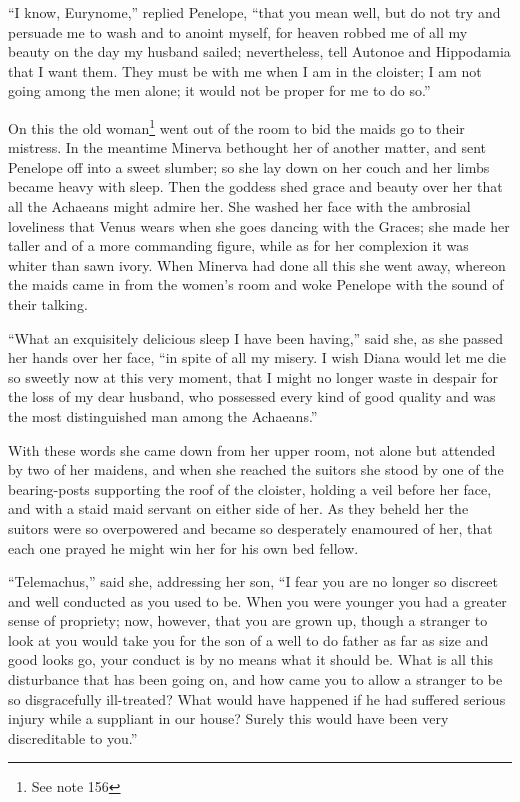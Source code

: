 “I know, Eurynome,” replied Penelope, “that you mean well, but do not try and
persuade me to wash and to anoint myself, for heaven robbed me of all my beauty
on the day my husband sailed; nevertheless, tell Autonoe and Hippodamia that I
want them. They must be with me when I am in the cloister; I am not going among
the men alone; it would not be proper for me to do so.”

On this the old woman\footnote{See note 156} went out of the room to bid the
maids go to their mistress. In the meantime Minerva bethought her of another
matter, and sent Penelope off into a sweet slumber; so she lay down on her
couch and her limbs became heavy with sleep. Then the goddess shed grace and
beauty over her that all the Achaeans might admire her. She washed her face
with the ambrosial loveliness that Venus wears when she goes dancing with the
Graces; she made her taller and of a more commanding figure, while as for her
complexion it was whiter than sawn ivory. When Minerva had done all this she
went away, whereon the maids came in from the women’s room and woke Penelope
with the sound of their talking.

“What an exquisitely delicious sleep I have been having,” said she, as she
passed her hands over her face, “in spite of all my misery. I wish Diana would
let me die so sweetly now at this very moment, that I might no longer waste in
despair for the loss of my dear husband, who possessed every kind of good
quality and was the most distinguished man among the Achaeans.”

With these words she came down from her upper room, not alone but attended by
two of her maidens, and when she reached the suitors she stood by one of the
bearing-posts supporting the roof of the cloister, holding a veil before her
face, and with a staid maid servant on either side of her. As they beheld her
the suitors were so overpowered and became so desperately enamoured of her,
that each one prayed he might win her for his own bed fellow.

“Telemachus,” said she, addressing her son, “I fear you are no longer so
discreet and well conducted as you used to be. When you were younger you had a
greater sense of propriety; now, however, that you are grown up, though a
stranger to look at you would take you for the son of a well to do father as
far as size and good looks go, your conduct is by no means what it should be.
What is all this disturbance that has been going on, and how came you to allow
a stranger to be so disgracefully ill-treated? What would have happened if he
had suffered serious injury while a suppliant in our house? Surely this would
have been very discreditable to you.”

